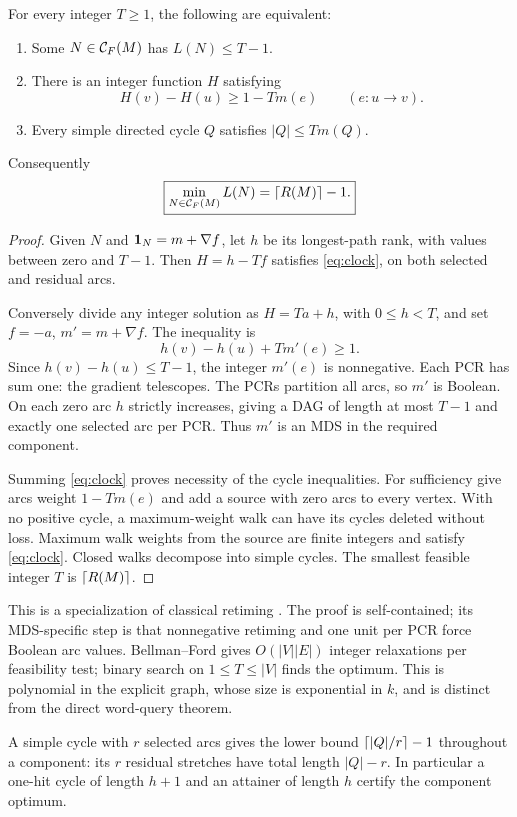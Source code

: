 \begin{theorem}\label{thm:unit-retiming}
For every integer $T\ge1$, the following are equivalent:
\begin{enumerate}
\item Some $N\in\mathcal C_F(M)$ has $L(N)\le T-1$.
\item There is an integer function $H$ satisfying
\begin{equation}
 H(v)-H(u)\ge1-Tm(e)\qquad(e:u\to v).
 \label{eq:clock}
\end{equation}
\item Every simple directed cycle $Q$ satisfies $|Q|\le Tm(Q)$.
\end{enumerate}
Consequently
\[
 \boxed{\min_{N\in\mathcal C_F(M)}L(N)=\left\lceil R(M)\right\rceil-1.}
\]
\end{theorem}
\begin{proof}
Given $N$ and $\mathbf 1_N=m+\nabla f$, let $h$ be its longest-path
rank, with values between zero and $T-1$. Then $H=h-Tf$
satisfies \eqref{eq:clock}, on both selected and residual arcs.

Conversely divide any integer solution as $H=Ta+h$, with
$0\le h<T$, and set $f=-a$, $m'=m+\nabla f$. The inequality is
\[
 h(v)-h(u)+Tm'(e)\ge1.
\]
Since $h(v)-h(u)\le T-1$, the integer $m'(e)$ is nonnegative.
Each PCR has sum one: the gradient telescopes. The PCRs partition
all arcs, so $m'$ is Boolean. On each zero arc $h$ strictly
increases, giving a DAG of length at most $T-1$ and exactly one
selected arc per PCR. Thus $m'$ is an MDS in the required
component.

Summing \eqref{eq:clock} proves necessity of the cycle inequalities.
For sufficiency give arcs weight $1-Tm(e)$ and add a source with
zero arcs to every vertex. With no positive cycle, a maximum-weight
walk can have its cycles deleted without loss. Maximum walk
weights from the source are finite integers and satisfy
\eqref{eq:clock}. Closed walks decompose into simple cycles.
The smallest feasible integer $T$ is $\left\lceil R(M)\right\rceil$.
\end{proof}
This is a specialization of classical retiming
\cite{LeisersonSaxe1991}. The proof is self-contained; its
MDS-specific step is that nonnegative retiming and one unit per
PCR force Boolean arc values. Bellman--Ford gives
$O(|V||E|)$ integer relaxations per feasibility test; binary search
on $1\le T\le|V|$ finds the optimum. This is polynomial in the
explicit graph, whose size is exponential in $k$, and is distinct
from the direct word-query theorem.

A simple cycle with $r$ selected arcs gives the lower bound
$\left\lceil|Q|/r\right\rceil-1$ throughout a component: its $r$ residual stretches
have total length $|Q|-r$. In particular a one-hit cycle of length
$h+1$ and an attainer of length $h$ certify the component optimum.

